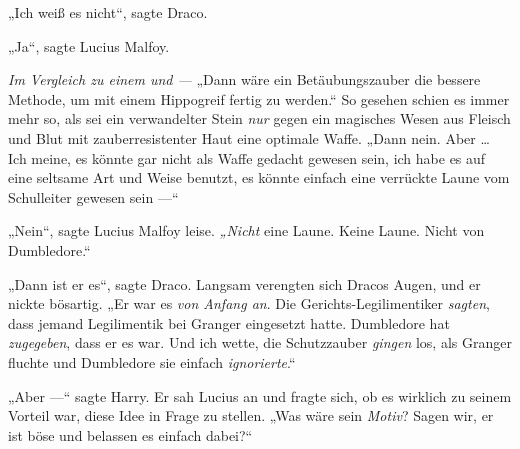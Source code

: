 „Ich weiß es nicht“, sagte Draco.

„Ja“, sagte Lucius Malfoy.

\emph{Im Vergleich zu einem  und  —}
„Dann wäre ein Betäubungszauber die bessere Methode, um mit einem Hippogreif fertig zu werden.“
So gesehen schien es immer mehr so, als sei ein verwandelter Stein \emph{nur} gegen ein magisches Wesen aus Fleisch und Blut mit zauberresistenter Haut eine optimale Waffe.
„Dann nein. Aber … Ich meine, es könnte gar nicht als Waffe gedacht gewesen sein, ich habe es auf eine seltsame Art und Weise benutzt, es könnte einfach eine verrückte Laune vom Schulleiter gewesen sein —“

„Nein“, sagte Lucius Malfoy leise. \emph{„Nicht} eine Laune. Keine Laune. Nicht von Dumbledore.“

„Dann ist er es“, sagte Draco.
Langsam verengten sich Dracos Augen, und er nickte bösartig.
„Er war es \emph{von Anfang an}. Die Gerichts-Legilimentiker \emph{sagten}, dass jemand Legilimentik bei Granger eingesetzt hatte. Dumbledore hat \emph{zugegeben}, dass er es war. Und ich wette, die Schutzzauber \emph{gingen} los, als Granger fluchte und Dumbledore sie einfach \emph{ignorierte}.“

„Aber —“ sagte Harry. Er sah Lucius an und fragte sich, ob es wirklich zu seinem Vorteil war, diese Idee in Frage zu stellen.
„Was wäre sein \emph{Motiv}? Sagen wir, er ist böse und belassen es einfach dabei?“

